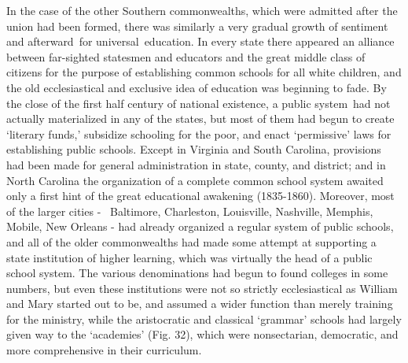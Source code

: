 \documentclass[
]{book}
\begin{document}
In the case of the other Southern commonwealths, which were admitted after the union had been formed, there was similarly a very gradual growth of sentiment and afterward~for universal~education. In every state there appeared an alliance between far-sighted statesmen and educators and the great middle class of citizens for the purpose of establishing common schools for all white children, and the old ecclesiastical and exclusive idea of education was beginning to fade. By the close of the first half century of national existence, a public system~had not actually materialized in any of the states, but most of them had begun to create `literary funds,' subsidize schooling for the poor, and enact `permissive' laws for establishing public schools. Except in Virginia and South Carolina, provisions had been made for general administration in state, county, and district; and in North Carolina the organization of a complete common school system awaited only a first hint of the great educational awakening (1835-1860). Moreover, most of the larger cities - ~Baltimore, Charleston, Louisville, Nashville, Memphis, Mobile, New Orleans - had already organized a regular system of public schools, and all of the older commonwealths had made some attempt at supporting a state institution of higher learning, which was virtually the head of a public school system. The various denominations had begun to found colleges in some numbers, but even these institutions were not so strictly ecclesiastical as William and Mary started out to be, and assumed a wider function than merely training for the ministry, while the aristocratic and classical `grammar' schools had largely given way to the `academies' (Fig. 32), which were nonsectarian, democratic, and more comprehensive in their curriculum.
\end{document}
